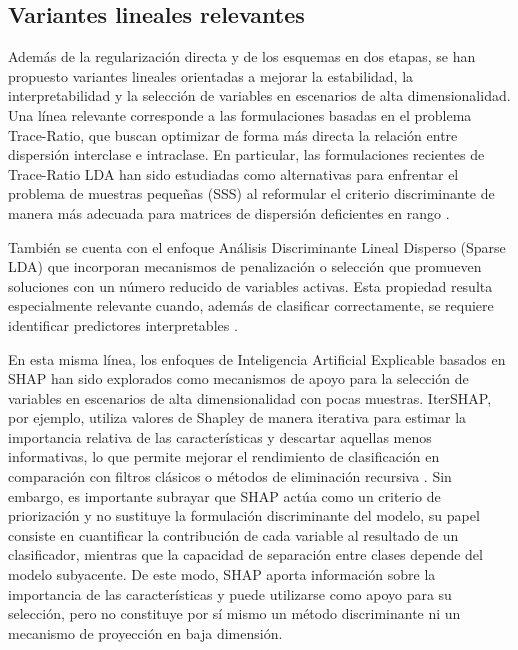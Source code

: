 \subsection{Variantes lineales relevantes}

Además de la regularización directa y de los esquemas en dos etapas, se han propuesto variantes lineales orientadas a mejorar la estabilidad, la interpretabilidad y la selección de variables en escenarios de alta dimensionalidad. Una línea relevante corresponde a las formulaciones basadas en el problema Trace-Ratio, que buscan optimizar de forma más directa la relación entre dispersión interclase e intraclase. En particular, las formulaciones recientes de Trace-Ratio LDA han sido estudiadas como alternativas para enfrentar el problema de muestras pequeñas (SSS) al reformular el criterio discriminante de manera más adecuada para matrices de dispersión deficientes en rango \cite{li2024revised,shi2024new}.

También se cuenta con el enfoque Análisis Discriminante Lineal Disperso (Sparse LDA) que incorporan mecanismos de penalización o selección que promueven soluciones con un número reducido de variables activas. Esta propiedad resulta especialmente relevante cuando, además de clasificar correctamente, se requiere identificar predictores interpretables \cite{liu2024efficient}. 

En esta misma línea, los enfoques de Inteligencia Artificial Explicable basados en SHAP han sido explorados como mecanismos de apoyo para la selección de variables en escenarios de alta dimensionalidad con pocas muestras. IterSHAP, por ejemplo, utiliza valores de Shapley de manera iterativa para estimar la importancia relativa de las características y descartar aquellas menos informativas, lo que permite mejorar el rendimiento de clasificación en comparación con filtros clásicos o métodos de eliminación recursiva \cite{van2024itershap}. Sin embargo, es importante subrayar que SHAP actúa como un criterio de priorización y no sustituye la formulación discriminante del modelo, su papel consiste en cuantificar la contribución de cada variable al resultado de un clasificador, mientras que la capacidad de separación entre clases depende del modelo subyacente. De este modo, SHAP aporta información sobre la importancia de las características y puede utilizarse como apoyo para su selección, pero no constituye por sí mismo un método discriminante ni un mecanismo de proyección en baja dimensión.



